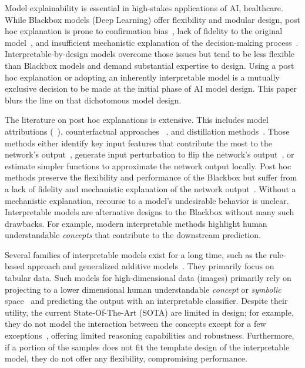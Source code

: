 

Model explainability is essential in high-stakes applications of AI, \eg healthcare. While Blackbox models (\eg Deep Learning) offer flexibility and modular design, post hoc explanation is prone to confirmation bias~\cite{wan2022explainability}, lack of fidelity to the original model~\cite{adebayo2018sanity}, and insufficient mechanistic explanation of the decision-making process~\cite{rudin2019stop}. Interpretable-by-design models overcome those issues but tend to be less flexible than Blackbox models and demand substantial expertise to design. Using a post hoc explanation or adopting an inherently interpretable model is a mutually exclusive decision to be made at the initial phase of AI model design. This paper blurs the line on that dichotomous model design.

The literature on post hoc explanations is extensive. This includes model attributions (~\cite{simonyan2013deep, selvaraju2017grad}), counterfactual approaches ~\cite{abid2021meaningfully, singla2019explanation}, and distillation methods~\cite{alharbi2021learning, cheng2020explaining}. Those methods either identify key input features that contribute the most to the network's output~\cite{shrikumar2016not}, generate input perturbation to flip the network's output~\cite{samek2016evaluating, montavon2018methods}, or estimate simpler functions to approximate the network output locally. Post hoc methods preserve the flexibility and performance of the Blackbox but suffer from a lack of fidelity and mechanistic explanation of the network output~\cite{rudin2019stop}. Without a mechanistic explanation, recourse to a model's undesirable behavior is unclear. Interpretable models are alternative designs to the Blackbox without many such drawbacks. For example, modern interpretable methods highlight human understandable \emph{concepts} that contribute to the downstream prediction.

Several families of interpretable models exist for a long time, such as the rule-based approach and generalized additive models~\cite{hastie1987generalized, letham2015interpretable, breiman1984classification}. They primarily focus on tabular data. Such models for high-dimensional data (\eg images) primarily rely on projecting to a lower dimensional human understandable \emph{concept} or \emph{symbolic} space~\cite{koh2020concept} and predicting the output with an interpretable classifier. Despite their utility, the current State-Of-The-Art (SOTA)
are limited in design; for example, they do not model the interaction between the concepts except for a few exceptions~\cite{ciravegna2021logic, barbiero2022entropy}, offering limited reasoning capabilities and robustness. Furthermore, if a portion of the samples does not fit the template design of the interpretable model, they do not offer any flexibility, compromising performance. 



